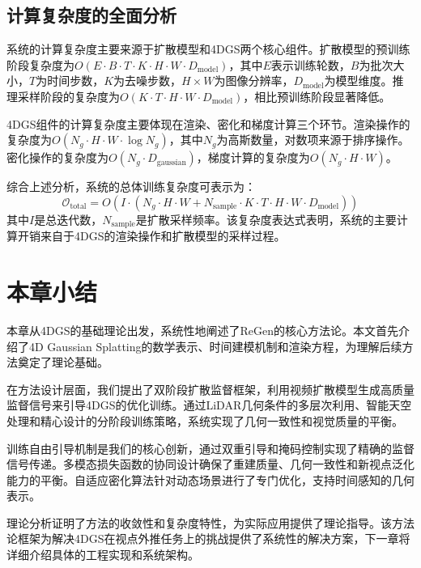 \subsection{计算复杂度的全面分析}

系统的计算复杂度主要来源于扩散模型和4DGS两个核心组件。扩散模型的预训练阶段复杂度为$O(E \cdot B \cdot T \cdot K \cdot H \cdot W \cdot D_{\text{model}})$，其中$E$表示训练轮数，$B$为批次大小，$T$为时间步数，$K$为去噪步数，$H \times W$为图像分辨率，$D_{\text{model}}$为模型维度。推理采样阶段的复杂度为$O(K \cdot T \cdot H \cdot W \cdot D_{\text{model}})$，相比预训练阶段显著降低。

4DGS组件的计算复杂度主要体现在渲染、密化和梯度计算三个环节。渲染操作的复杂度为$O(N_g \cdot H \cdot W \cdot \log N_g)$，其中$N_g$为高斯数量，对数项来源于排序操作。密化操作的复杂度为$O(N_g \cdot D_{\text{gaussian}})$，梯度计算的复杂度为$O(N_g \cdot H \cdot W)$。

综合上述分析，系统的总体训练复杂度可表示为：
\begin{equation}
\mathcal{O}_{\text{total}} = O(I \cdot (N_g \cdot H \cdot W + N_{\text{sample}} \cdot K \cdot T \cdot H \cdot W \cdot D_{\text{model}}))
\label{eq:total_complexity}
\end{equation}
其中$I$是总迭代数，$N_{\text{sample}}$是扩散采样频率。该复杂度表达式表明，系统的主要计算开销来自于4DGS的渲染操作和扩散模型的采样过程。

\section{本章小结}

本章从4DGS的基础理论出发，系统性地阐述了ReGen的核心方法论。本文首先介绍了4D Gaussian Splatting的数学表示、时间建模机制和渲染方程，为理解后续方法奠定了理论基础。

在方法设计层面，我们提出了双阶段扩散监督框架，利用视频扩散模型生成高质量监督信号来引导4DGS的优化训练。通过LiDAR几何条件的多层次利用、智能天空处理和精心设计的分阶段训练策略，系统实现了几何一致性和视觉质量的平衡。

训练自由引导机制是我们的核心创新，通过双重引导和掩码控制实现了精确的监督信号传递。多模态损失函数的协同设计确保了重建质量、几何一致性和新视点泛化能力的平衡。自适应密化算法针对动态场景进行了专门优化，支持时间感知的几何表示。

理论分析证明了方法的收敛性和复杂度特性，为实际应用提供了理论指导。该方法论框架为解决4DGS在视点外推任务上的挑战提供了系统性的解决方案，下一章将详细介绍具体的工程实现和系统架构。
